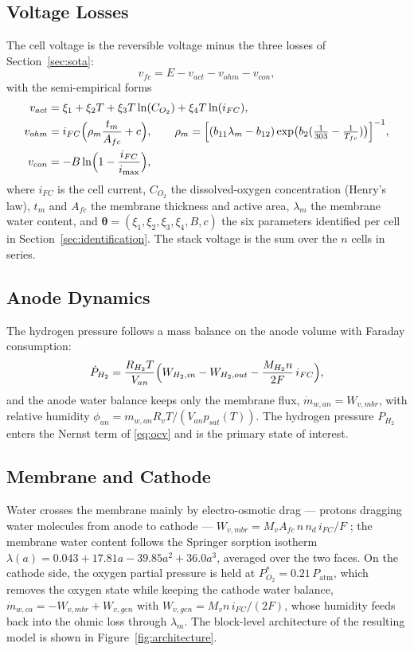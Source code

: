 \subsection{Voltage Losses}
The cell voltage is the reversible voltage minus the three losses of
Section~\ref{sec:sota}:
\begin{equation}
    \label{eq:vfc}
    v_{fc} = E - v_{act} - v_{ohm} - v_{con},
\end{equation}
with the semi-empirical forms \cite{pukrushpan2003,thanapalan2008,cao2019}
\begin{align}
    v_{act} &= \xi_1+\xi_2 T+\xi_3 T\ln(C_{O_2})+\xi_4 T\ln(i_{FC}),
    \label{eq:vact}\\
    v_{ohm} &= i_{FC}\Bigl(\rho_m\frac{t_m}{A_{fc}}+c\Bigr),
    \qquad
    \rho_m = \Bigl[(b_{11}\lambda_m-b_{12})
              \exp\bigl(b_2(\tfrac{1}{303}-\tfrac{1}{T_{fc}})\bigr)\Bigr]^{-1},
    \label{eq:vohm}\\
    v_{con} &= -B\ln\Bigl(1-\frac{i_{FC}}{i_{\max}}\Bigr),
    \label{eq:vcon}
\end{align}
where $i_{FC}$ is the cell current, $C_{O_2}$ the dissolved-oxygen concentration
(Henry's law), $t_m$ and $A_{fc}$ the membrane thickness and active area,
$\lambda_m$ the membrane water content, and
$\boldsymbol{\theta}=(\xi_1,\xi_2,\xi_3,\xi_4,B,c)$ the six parameters identified
per cell in Section~\ref{sec:identification}. The stack voltage is the sum over
the $n$ cells in series.

\subsection{Anode Dynamics}
The hydrogen pressure follows a mass balance on the anode volume with Faraday
consumption:
\begin{equation}
    \label{eq:anode}
    \dot{P}_{H_2}=\frac{R_{H_2}T}{V_{an}}
    \Bigl(W_{H_2,in}-W_{H_2,out}-\frac{M_{H_2}n}{2F}\,i_{FC}\Bigr),
\end{equation}
and the anode water balance keeps only the membrane flux,
$\dot{m}_{w,an}=W_{v,mbr}$, with relative humidity
$\phi_{an}=m_{w,an}R_vT/(V_{an}p_{sat}(T))$. The hydrogen pressure $P_{H_2}$
enters the Nernst term of \eqref{eq:ocv} and is the primary state of interest.

\subsection{Membrane and Cathode}
\label{sec:membrane}
Water crosses the membrane mainly by electro-osmotic drag --- protons dragging
water molecules from anode to cathode ---
$W_{v,mbr}=M_v A_{fc}\,n\,n_d\,i_{FC}/F$ \cite{pukrushpan2003}; the membrane water
content follows the Springer sorption isotherm
$\lambda(a)=0.043+17.81a-39.85a^2+36.0a^3$, averaged over the two faces. On the
cathode side, the oxygen partial pressure is held at
$P_{O_2}^{\ast}=0.21\,P_{\mathrm{atm}}$, which removes the oxygen state while
keeping the cathode water balance,
$\dot{m}_{w,ca}=-W_{v,mbr}+W_{v,gen}$ with $W_{v,gen}=M_v n\,i_{FC}/(2F)$, whose
humidity feeds back into the ohmic loss through $\lambda_m$. The block-level
architecture of the resulting model is shown in Figure~\ref{fig:architecture}.

